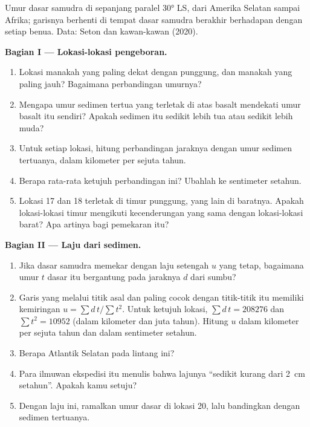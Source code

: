 \begin{problem}
\begin{center}
{\small Umur dasar samudra di sepanjang paralel \ang{30} LS, dari Amerika
Selatan sampai Afrika; garisnya berhenti di tempat dasar samudra berakhir
berhadapan dengan setiap benua. Data: Seton dan kawan-kawan (2020).}
\end{center}

\medskip
\noindent\textbf{Bagian I --- Lokasi-lokasi pengeboran.}
\begin{enumerate}
  \item Lokasi manakah yang paling dekat dengan punggung, dan manakah yang
        paling jauh? Bagaimana perbandingan umurnya?
  \item Mengapa umur sedimen tertua yang terletak di atas basalt mendekati
        umur basalt itu sendiri? Apakah sedimen itu sedikit lebih tua atau
        sedikit lebih muda?
  \item Untuk setiap lokasi, hitung perbandingan jaraknya dengan umur sedimen
        tertuanya, dalam kilometer per sejuta tahun.
  \item Berapa rata-rata ketujuh perbandingan ini? Ubahlah ke sentimeter
        setahun.
  \item Lokasi 17 dan 18 terletak di timur punggung, yang lain di baratnya.
        Apakah lokasi-lokasi timur mengikuti kecenderungan yang sama dengan
        lokasi-lokasi barat? Apa artinya bagi pemekaran itu?
\end{enumerate}

\medskip
\noindent\textbf{Bagian II --- Laju dari sedimen.}
\begin{enumerate}[resume]
  \item Jika dasar samudra memekar dengan laju setengah $u$ yang tetap,
        bagaimana umur $t$ dasar itu bergantung pada jaraknya $d$ dari sumbu?
  \item Garis yang melalui titik asal dan paling cocok dengan titik-titik itu
        memiliki kemiringan $u = \sum d\,t / \sum t^2$. Untuk ketujuh lokasi,
        $\sum d\,t = \num{208276}$ dan $\sum t^2 = \num{10952}$ (dalam
        kilometer dan juta tahun). Hitung $u$ dalam kilometer per sejuta
        tahun dan dalam sentimeter setahun.
  \item Berapa  Atlantik Selatan pada lintang ini?
  \item Para ilmuwan ekspedisi itu menulis bahwa lajunya ``sedikit kurang
        dari \qty{2}{cm} setahun''. Apakah kamu setuju?
  \item Dengan laju ini, ramalkan umur dasar di lokasi 20, lalu bandingkan
        dengan sedimen tertuanya.
\end{enumerate}


\end{problem}
